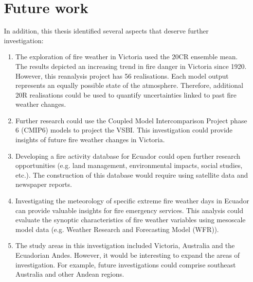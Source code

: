 \section{Future work}

In addition, this thesis identified several aspects that deserve further
investigation:
\begin{enumerate}
\item The exploration of fire weather in Victoria used the 20CR ensemble
mean. The results depicted an increasing trend in fire danger in Victoria
since 1920. However, this reanalysis project has 56 realisations.
Each model output represents an equally possible state of the atmosphere.
Therefore, additional 20R realisations could be used to quantify uncertainties
linked to past fire weather changes.
\item Further research could use the Coupled Model Intercomparison Project
phase 6 (CMIP6) models to project the VSBI. This investigation could
provide insights of future fire weather changes in Victoria.
\item Developing a fire activity database for Ecuador could open further
research opportunities (e.g. land management, environmental impacts,
social studies, etc.). The construction of this database would require using
satellite data and newspaper reports.
\item Investigating the meteorology of specific extreme fire weather days in Ecuador can provide valuable insights for fire emergency services. This analysis could evaluate the synoptic characteristics of fire weather variables using mesoscale model data (e.g. Weather Research and Forecasting Model (WFR)). 
\item The study areas in this investigation included Victoria, Australia
and the Ecuadorian Andes. However, it would be interesting to expand
the areas of investigation. For example, future investigations could
comprise southeast Australia and other Andean regions.
\end{enumerate}


 


